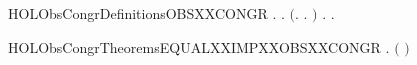 \newcommand{\HOLObsCongrDate}{04 Settembre 2019}
\newcommand{\HOLObsCongrTime}{20:21}
\begin{SaveVerbatim}{HOLObsCongrDefinitionsOBSXXCONGR}
\HOLTokenTurnstile{} \HOLSymConst{\HOLTokenForall{}} .
          \HOLSymConst{\HOLTokenEquiv{}}
       \HOLSymConst{\HOLTokenForall{}}.
           \ensuremath{(}\HOLSymConst{\HOLTokenForall{}}.  \HOLTokenTransBegin{}\HOLTokenTransEnd {} \HOLSymConst{\HOLTokenImp{}} \HOLSymConst{\HOLTokenExists{}}.  \HOLTokenWeakTransBegin{}\HOLTokenWeakTransEnd {} \HOLSymConst{\HOLTokenConj{}}   \ensuremath{)} \HOLSymConst{\HOLTokenConj{}}
           \HOLSymConst{\HOLTokenForall{}}.  \HOLTokenTransBegin{}\HOLTokenTransEnd {} \HOLSymConst{\HOLTokenImp{}} \HOLSymConst{\HOLTokenExists{}}.  \HOLTokenWeakTransBegin{}\HOLTokenWeakTransEnd {} \HOLSymConst{\HOLTokenConj{}}   
\end{SaveVerbatim}
\newcommand{\HOLObsCongrDefinitionsOBSXXCONGR}{\UseVerbatim{HOLObsCongrDefinitionsOBSXXCONGR}}
\newcommand{\HOLObsCongrDefinitions}{
\HOLDfnTag{ObsCongr}{OBS_CONGR}\HOLObsCongrDefinitionsOBSXXCONGR
}
\begin{SaveVerbatim}{HOLObsCongrTheoremsEQUALXXIMPXXOBSXXCONGR}
\HOLTokenTurnstile{} \HOLSymConst{\HOLTokenForall{}} . \ensuremath{(} \HOLSymConst{\ensuremath{=}} \ensuremath{)} \HOLSymConst{\HOLTokenImp{}}   
\end{SaveVerbatim}
\newcommand{\HOLObsCongrTheoremsEQUALXXIMPXXOBSXXCONGR}{\UseVerbatim{HOLObsCongrTheoremsEQUALXXIMPXXOBSXXCONGR}}
